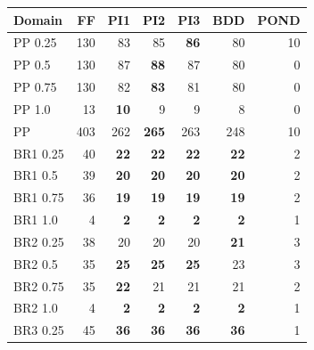 \documentclass{article}
\begin{document}

\begin{table}				\small\centering																				
\begin{tabular}{|l|r|r@{ }r@{ }r@{ }r|r|}																								
\hline																								
Domain	&		FF		&		PI1		&		PI2		&		PI3		&		BDD		&	POND	\\ \hline	\hline
PP 0.25	&		130		&		83		&		85		&	{\bf	86}	&		80		&	10	\\	
PP 0.5	&		130		&		87		&	{\bf	88}	&		87		&		80		&	0	\\	
PP 0.75	&		130		&		82		&	{\bf	83}	&		81		&		80		&	0	\\	
PP 1.0	&		13		&	{\bf	10}	&		9		&		9		&		8		&	0	\\	\hline
PP	&		403		&		262		&	{\bf	265}	&		263		&		248		&	10	\\	\hline\hline
BR1 0.25 	&		40		&	{\bf	22}	&	{\bf	22}	&	{\bf	22}	&	{\bf	22}	&	2	\\	
BR1 0.5 	&		39		&	{\bf	20}	&	{\bf	20}	&	{\bf	20}	&	{\bf	20}	&	2	\\	
BR1 0.75 	&		36		&	{\bf	19}	&	{\bf	19}	&	{\bf	19}	&	{\bf	19}	&	2	\\	
BR1 1.0 	&		4		&	{\bf	2}	&	{\bf	2}	&	{\bf	2}	&	{\bf	2}	&	1	\\	
BR2 0.25 	&		38		&		20		&		20		&		20		&	{\bf	21}	&	3	\\	
BR2 0.5 	&		35		&	{\bf	25}	&	{\bf	25}	&	{\bf	25}	&		23		&	3	\\	
BR2 0.75 	&		35		&	{\bf	22}	&		21		&		21		&		21		&	2	\\	
BR2 1.0 	&		4		&	{\bf	2}	&	{\bf	2}	&	{\bf	2}	&	{\bf	2}	&	1	\\	
BR3 0.25 	&		45		&	{\bf	36}	&	{\bf	36}	&	{\bf	36}	&	{\bf	36}	&	1	\\	

\end{tabular}
\end{table}
\end{document}
